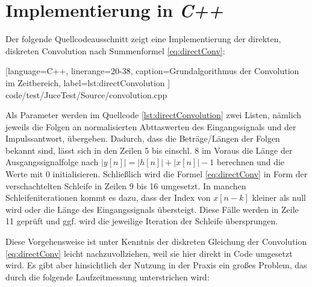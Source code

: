 \section{Implementierung in \textit{C++}}
\label{sec:implementation}

Der folgende Quellcodeausschnitt zeigt eine Implementierung der direkten, diskreten Convolution
nach Summenformel \ref{eq:directConv}:




[language=C++, linerange={20-38}, caption={Grundalgorithmus der Convolution im Zeitbereich},
label={lst:directConvolution}
]
{code/test/JuceTest/Source/convolution.cpp}

Als Parameter werden im Quellcode \ref{lst:directConvolution} zwei Listen, nämlich jeweils die Folgen
an normalisierten Abttaswerten des Eingangssignals und der Impulssantwort, übergeben.
Dadurch, dass die Beträge/Längen der Folgen bekannt sind, lässt sich in den Zeilen 5 bis einschl. 8
im Voraus die Länge der Ausgangssignalfolge nach $|y[n]| = |h[n]| + |x[n]| - 1$ berechnen und die Werte mit 0 initialisieren.
Schließlich wird die Formel \ref{eq:directConv} in Form der verschachtelten Schleife
in Zeilen 9 bis 16 umgesetzt. In manchen Schleifeniterationen kommt es dazu, dass der Index von $x[n - k]$
kleiner als null wird oder die Länge des Eingangssignals übersteigt. Diese Fälle werden in Zeile 11 geprüft und
ggf. wird die jeweilige Iteration der Schleife übersprungen.

Diese Vorgehensweise ist unter Kenntnis der diskreten Gleichung der Convolution \ref{eq:directConv}
leicht nachzuvollziehen, weil sie hier direkt in Code umgesetzt wird.
Es gibt aber hinsichtlich der Nutzung in der Praxis ein großes Problem, das durch die folgende Laufzeitmessung unterstrichen wird:

